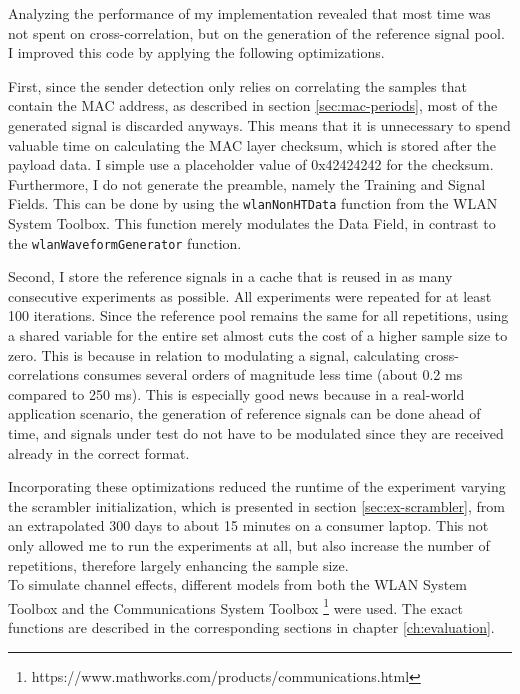 Analyzing the performance of my implementation revealed that most time was not spent on cross-correlation, but on the generation of the reference signal pool. I improved this code by applying the following optimizations.

First, since the sender detection only relies on correlating the samples that contain the \gls{MAC} address, as described in section \ref{sec:mac-periods}, most of the generated signal is discarded anyways. This means that it is unnecessary to spend valuable time on calculating the \gls{MAC} layer checksum, which is stored after the payload data. I simple use a placeholder value of 0x42424242 for the checksum. Furthermore, I do not generate the preamble, namely the Training and Signal Fields. This can be done by using the \texttt{wlanNonHTData} function from the WLAN System Toolbox. This function merely modulates the Data Field, in contrast to the \texttt{wlanWaveformGenerator} function.

Second, I store the reference signals in a cache that is reused in as many consecutive experiments as possible. All experiments were repeated for at least 100 iterations. Since the reference pool remains the same for all repetitions, using a shared variable for the entire set almost cuts the cost of a higher sample size to zero. This is because in relation to modulating a signal, calculating cross-correlations consumes several orders of magnitude less time (about 0.2 ms compared to 250 ms). This is especially good news because in a real-world application scenario, the generation of reference signals can be done ahead of time, and signals under test do not have to be modulated since they are received already in the correct format.

Incorporating these optimizations reduced the runtime of the experiment varying the scrambler initialization, which is presented in section \ref{sec:ex-scrambler}, from an extrapolated 300 days to about 15 minutes on a consumer laptop. This not only allowed me to run the experiments at all, but also increase the number of repetitions, therefore largely enhancing the sample size.\\

To simulate channel effects, different models from both the WLAN System Toolbox and the Communications System Toolbox \footnote{https://www.mathworks.com/products/communications.html} were used. The exact functions are described in the corresponding sections in chapter \ref{ch:evaluation}.\\

